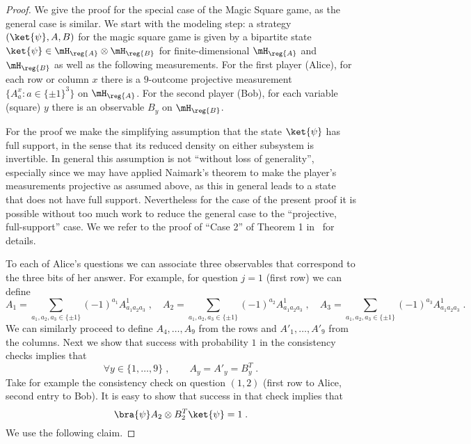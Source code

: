 \begin{proof}
We give the proof for the special case of the Magic Square game, as the general case is similar. We start with the modeling step: a strategy $(\ket{\psi},A,B)$ for the magic square game is given by a bipartite state $\ket{\psi} \in \mH_\reg{A} \otimes \mH_\reg{B}$ for finite-dimensional $\mH_\reg{A}$ and $\mH_{\reg{B}}$ as well as the following measurements. For the first player (Alice), for each row or column $x$ there is a $9$-outcome projective measurement $\{A^x_a : a\in\{\pm 1\}^3\}$ on $\mH_\reg{A}$. For the second player (Bob), for each variable (square) $y$ there is an observable $B_y$ on $\mH_\reg{B}$. 

For the proof we make the simplifying assumption that the state $\ket{\psi}$ has full support, in the sense that its reduced density on either subsystem is invertible. In general this assumption is not ``without loss of generality'', especially since we may have applied Naimark's theorem to make the player's measurements projective as assumed above, as this in general leads to a state that does not have full support. Nevertheless for the case of the present proof it is possible without too much work to reduce the general case to the ``projective, full-support'' case. We we refer to the proof of ``Case 2'' of Theorem 1 in~\cite{cleve2014characterization} for details. 

To each of Alice's questions we can associate three observables that correspond to the three bits of her answer. For example, for question $j=1$ (first row) we can define 
\[ A_1 = \sum_{a_1,a_2,a_3\in \{\pm 1\}}  (-1)^{a_1} A^1_{a_1a_2a_3}\;,\quad   A_2 = \sum_{a_1,a_2,a_3\in \{\pm 1\}}  (-1)^{a_2} A^1_{a_1a_2a_3}\;,\quad  A_3 = \sum_{a_1,a_2,a_3\in \{\pm 1\}}  (-1)^{a_3} A^1_{a_1a_2a_3}\;.\]
We can similarly proceed to define $A_4,\ldots,A_9$ from the rows and $A'_1,\ldots,A'_9$ from the columns. Next we show that success with probability $1$ in the consistency checks implies that 
\begin{equation}\label{eq:bcs-tensor-1}
\forall y\in\{1,\ldots,9\}\;,\qquad A_y = A'_y = B_y^T\;.
\end{equation} 
Take for example the consistency check on question $(1,2)$ (first row to Alice, second entry to Bob). It is easy to show that success in that check implies that 
\begin{equation}\label{eq:bcs-tensor-2}
\bra{\psi} A_2 \otimes B_2^T \ket{\psi}=1\;.
\end{equation}
 We use the following claim.


\end{proof}
